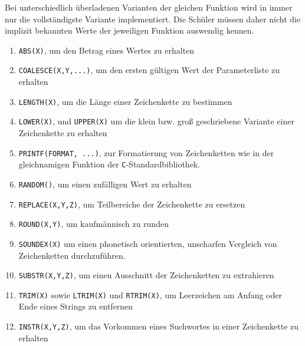 \begin{enumerate}[resume]
  Bei unterschiedlich überladenen Varianten der gleichen Funktion wird in \idename{} immer nur die vollständigste Variante implementiert. Die Schüler müssen daher nicht die implizit bekannten Werte der jeweiligen Funktion auswendig kennen.
  \begin{enumerate}[noitemsep]
  \item \label{feat:fun-abs} \texttt{ABS(X)}, um den Betrag eines Wertes zu erhalten
  \item \label{feat:fun-coalesce} \texttt{COALESCE(X,Y,...)}, um den ersten gültigen Wert der Parameterliste zu erhalten
  \item \label{feat:fun-length} \texttt{LENGTH(X)}, um die Länge einer Zeichenkette zu bestimmen
  \item \label{feat:fun-casing} \texttt{LOWER(X)}, und \texttt{UPPER(X)} um die klein bzw. groß geschriebene Variante einer Zeichenkette zu erhalten
  \item \label{feat:fun-printf} \texttt{PRINTF(FORMAT, ...)}, zur Formatierung von Zeichenketten wie in der gleichnamigen Funktion der \texttt{C}-Standardbibliothek.
  \item \label{feat:fun-random} \texttt{RANDOM()}, um einen zufälligen Wert zu erhalten
  \item \label{feat:fun-replace} \texttt{REPLACE(X,Y,Z)}, um Teilbereiche der Zeichenkette zu ersetzen
  \item \label{feat:fun-round} \texttt{ROUND(X,Y)}, um kaufmännisch zu runden
     \item \label{feat:fun-soundex} \texttt{SOUNDEX(X)} um einen phonetisch orientierten, unscharfen Vergleich von Zeichenketten durchzuführen.
  \item \label{feat:fun-substr} \texttt{SUBSTR(X,Y,Z)}, um einen Ausschnitt der Zeichenketten zu extrahieren
  \item \label{feat:fun-trim} \texttt{TRIM(X)} sowie \texttt{LTRIM(X)} und \texttt{RTRIM(X)}, um Leerzeichen am Anfang oder Ende eines Strings zu entfernen
  \item \label{feat:fun-instr} \texttt{INSTR(X,Y,Z)}, um das Vorkommen eines Suchwortes in einer Zeichenkette zu erhalten
  \end{enumerate}


\end{enumerate}
